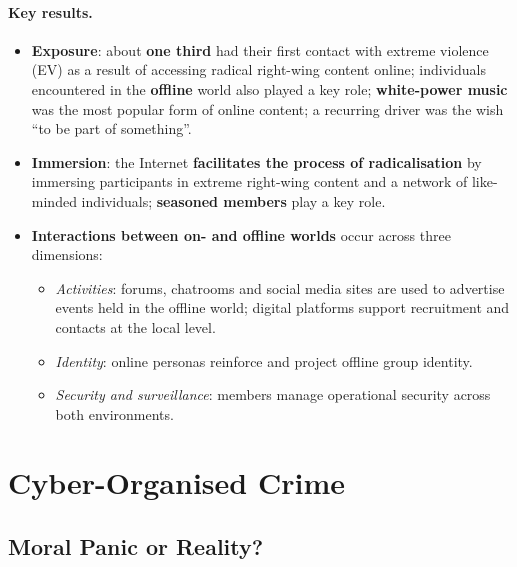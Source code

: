 \documentclass[11pt,a4paper,openany]{report}
\theoremstyle{definition}
\theoremstyle{plain}
\theoremstyle{remark}
\begin{document}
\paragraph{Key results.}
\begin{itemize}
    \item \textbf{Exposure}: about \textbf{one third} had their first contact with extreme violence (EV) as a result of accessing radical right-wing content online; individuals encountered in the \textbf{offline} world also played a key role; \textbf{white-power music} was the most popular form of online content; a recurring driver was the wish ``to be part of something''.
    \item \textbf{Immersion}: the Internet \textbf{facilitates the process of radicalisation} by immersing participants in extreme right-wing content and a network of like-minded individuals; \textbf{seasoned members} play a key role.
    \item \textbf{Interactions between on- and offline worlds} occur across three dimensions:
    \begin{itemize}
        \item \textit{Activities}: forums, chatrooms and social media sites are used to advertise events held in the offline world; digital platforms support recruitment and contacts at the local level.
        \item \textit{Identity}: online personas reinforce and project offline group identity.
        \item \textit{Security and surveillance}: members manage operational security across both environments.
    \end{itemize}
\end{itemize}

\section{Cyber-Organised Crime}

\subsection{Moral Panic or Reality?}
\end{document}
